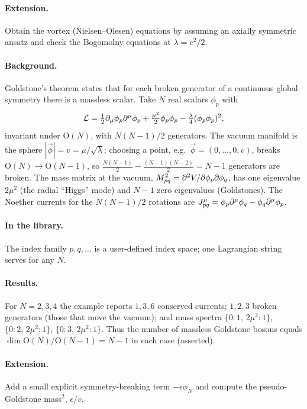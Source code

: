 \paragraph{Extension.} Obtain the vortex (Nielsen--Olesen) equations by assuming an axially symmetric ansatz and check the Bogomolny equations at $\lambda=e^2/2$.


\paragraph{Background.} Goldstone's theorem \cite{Goldstone1961} states that for each broken generator of a continuous global symmetry there is a massless scalar. Take $N$ real scalars $\phi_p$ with
\begin{equation}
\mathcal L=\tfrac12\partial_\mu\phi_p\partial^\mu\phi_p+\tfrac{\mu^2}2\phi_p\phi_p-\tfrac\lambda4(\phi_p\phi_p)^2,
\end{equation}
invariant under $\mathrm O(N)$, with $N(N-1)/2$ generators. The vacuum manifold is the sphere $|\vec\phi|=v=\mu/\sqrt\lambda$; choosing a point, e.g.\ $\vec\phi=(0,\dots,0,v)$, breaks $\mathrm O(N)\to\mathrm O(N-1)$, so $\tfrac{N(N-1)}2-\tfrac{(N-1)(N-2)}2=N-1$ generators are broken. The mass matrix at the vacuum, $M^2_{pq}=\partial^2V/\partial\phi_p\partial\phi_q$, has one eigenvalue $2\mu^2$ (the radial ``Higgs'' mode) and $N-1$ zero eigenvalues (Goldstones). The Noether currents for the $N(N-1)/2$ rotations are $J^\mu_{pq}=\phi_p\partial^\mu\phi_q-\phi_q\partial^\mu\phi_p$.

\paragraph{In the library.} The index family $p,q,\dots$ is a user-defined index space; one Lagrangian string serves for any $N$.


\paragraph{Results.} For $N=2,3,4$ the example reports $1,3,6$ conserved currents; $1,2,3$ broken generators (those that move the vacuum); and mass spectra $\{0:1,\,2\mu^2:1\}$, $\{0:2,\,2\mu^2:1\}$, $\{0:3,\,2\mu^2:1\}$. Thus the number of massless Goldstone bosons equals $\dim\mathrm O(N)/\mathrm O(N-1)=N-1$ in each case (asserted).

\paragraph{Extension.} Add a small explicit symmetry-breaking term $-\epsilon\phi_N$ and compute the pseudo-Goldstone mass$^2$, $\epsilon/v$.
